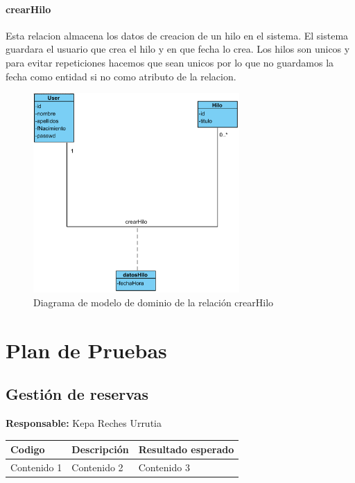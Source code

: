 ﻿\documentclass{report}
\begin{document}
                \subsubsection{crearHilo}
                    Esta relacion almacena los datos de creacion de un hilo en el sistema. El sistema guardara el usuario que crea el hilo y en que fecha lo crea. Los hilos son unicos y para evitar repeticiones hacemos que sean unicos por lo que no guardamos la fecha como entidad si no como atributo de la relacion.
                    \begin{figure}[H]
                        \centering
                        \includegraphics[width=0.7\textwidth]{img/dominio/crearHilo.png}
                        \caption{Diagrama de modelo de dominio de la relación crearHilo}
                    \end{figure}
    \chapter{Plan de Pruebas}
        \section{Gestión de reservas}
            \begin{center}
                \textbf{Responsable:} Kepa Reches Urrutia\\
                \begin{longtable}{|m{2cm}|m{4cm}|m{4cm}|}
                    \hline
                    Codigo & Descripción & Resultado esperado \\
                    \hline
                    \endhead
                    Contenido 1 & Contenido 2 & Contenido 3 \\
                    \hline
                \end{longtable}
            \end{center}
            \clearpage
\end{document}
